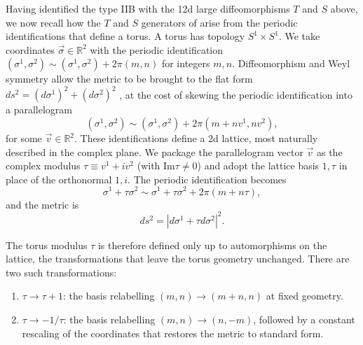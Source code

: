 Having identified the type IIB \SLZ{} with the 12d large diffeomorphisms $T$ and $S$ above, we now recall how the $T$ and $S$ generators of \SLZ{} arise from the periodic identifications that define a torus. 
A torus has topology $S^1 \times S^1$. 
We take coordinates $\vec{\sigma} \in \mathbb{R}^2$ with the periodic identification $(\sigma^1,\sigma^2)\sim (\sigma^1,\sigma^2) + 2\pi (m,n)$ for integers $m,n$.
Diffeomorphism and Weyl symmetry allow the metric to be brought to the flat form $ds^2 = (d\sigma^{1})^2+(d\sigma^{2})^2$ \cite{Polchinski:1998rq}, at the cost of skewing the periodic identification into a parallelogram
\begin{equation}
(\sigma^1,\sigma^2) \sim (\sigma^1,\sigma^2) + 2\pi (m+nv^1,n v^2),
\end{equation}
for some $\vec{v} \in \mathbb{R}^2$.
These identifications define a 2d lattice, most naturally described in the complex plane.
We package the parallelogram vector $\vec{v}$ as the complex modulus $\tau \equiv v^1 + i v^2$ (with $\text{Im} \tau \neq 0$) and adopt the lattice basis $1, \tau$ in place of the orthonormal $1, i$.
The periodic identification becomes
\begin{equation}
\sigma^1 + \tau \sigma^2 \sim \sigma^1 + \tau \sigma^2 + 2\pi(m + n\tau),
\end{equation}
and the metric is
\begin{equation}
ds^2 = |d\sigma^1 + \tau d\sigma^2|^2.
\end{equation}

The torus modulus $\tau$ is therefore defined only up to automorphisms on the lattice, the transformations that leave the torus geometry unchanged.
There are two such transformations:
\begin{enumerate}
    \item $\tau \to \tau+1$: the basis relabelling $(m, n) \to (m+n,n)$ at fixed geometry.
    \item $\tau \to -1/\tau$: the basis relabelling $(m, n) \to (n,-m)$, followed by a constant rescaling of the coordinates that restores the metric to standard form.
\end{enumerate}

